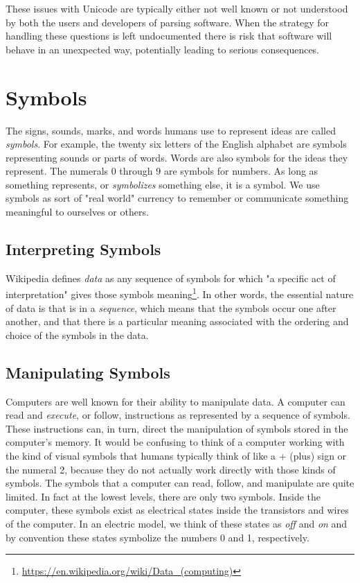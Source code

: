\documentclass{book}
\newcommand{\newterm}[2]{\textit{#1}\index{#2}}
\begin{document}
These issues with Unicode are typically either not well known or not 
understood by both the users and developers of parsing software.
When the strategy for handling these questions is left undocumented
there is risk that software will behave in an unexpected way, 
potentially leading to serious consequences.

\section{Symbols}
The signs, sounds, marks, and words humans use to represent ideas are called
\newterm{symbols}{Symbol}. For example, the twenty six letters of
the English alphabet are symbols representing sounds or parts of words. Words
are also symbols for the ideas they represent. 
The numerals 0 through 9 are symbols for numbers.
As long as something represents, or \textit{symbolizes} something else, 
it is a symbol. We use symbols as sort of "real world" currency
to remember or communicate something meaningful to ourselves or others.

\subsection{Interpreting Symbols}
Wikipedia defines
\newterm{data}{Data} as any sequence of symbols for which "a specific act of
interpretation" gives those symbols
meaning\footnote{\url{https://en.wikipedia.org/wiki/Data\_(computing)}}.
In other words, the essential nature of data is that is in a
\newterm{sequence}{Sequence}, which means that the symbols occur one after
another, and that there is a particular meaning associated with 
the ordering and choice of the symbols in the data.

\subsection{Manipulating Symbols}

Computers are well known for their ability to manipulate data.
A computer can read and \newterm{execute}{Execution}, or follow,
instructions as represented by a sequence of symbols.
These instructions can, in
turn, direct the manipulation of symbols stored in the computer's memory.
It would be confusing to think of a computer working with the kind of visual
symbols that humans typically think of like a + (plus) sign or the numeral 2,
because they do not actually work directly with those kinds of symbols.
The symbols that a computer can read, follow, and manipulate are quite limited.
In fact at the lowest levels, there are only two symbols. Inside the computer,
these symbols exist as electrical states inside the transistors and wires of 
the computer. In an electric model, we think of these states
as  \textit{off} and \textit{on} and by convention these states symbolize the
numbers 0 and 1, respectively.
\end{document}
